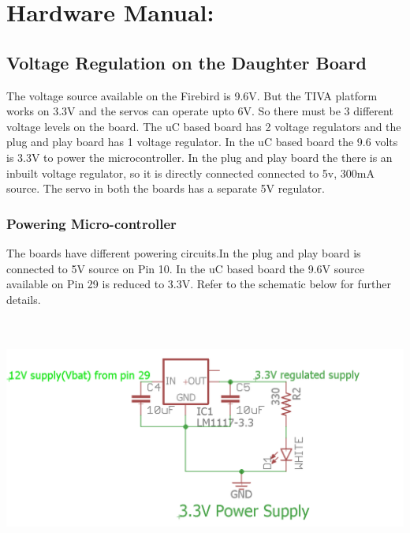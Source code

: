 \documentclass[a4paper,10pt,oneside]{article}
\begin{document}
{	\section{\Huge\textbf{Hardware Manual:}}
	\subsection{\huge \textbf{Voltage Regulation on the Daughter Board\\}}
	{The voltage source available on the Firebird is 9.6V. But the TIVA platform works on 3.3V and the servos can operate upto 6V. So there must be 3 different voltage levels on the board. The uC based board has 2 voltage regulators and the plug and play board has 1 voltage regulator. In the uC based board the 9.6 volts is 3.3V to power the microcontroller. In the plug and play board the there is an inbuilt voltage regulator, so it is directly connected connected to 5v, 300mA source. The servo in both the boards has a separate 5V regulator.}
	
	\subsubsection{\Large \textbf{Powering Micro-controller}}
	{The boards have different powering circuits.In the plug and play board is connected to 5V source on Pin 10. In the uC based board the 9.6V source available on Pin 29 is reduced to 3.3V. Refer to the schematic below for further details.\\} 
				
	\includegraphics[width=18cm, height=8cm]{3VPowerSupply}\\\\
				
}
\end{document}
